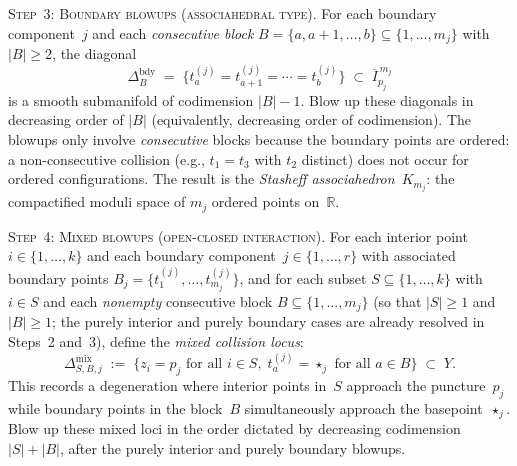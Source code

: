 \begin{construction}
\medskip
\noindent\textsc{Step~3: Boundary blowups (associahedral type).}
For each boundary component~$j$ and each \emph{consecutive
block} $B = \{a, a{+}1, \ldots, b\} \subseteq
\{1, \ldots, m_j\}$ with $|B| \geq 2$,
the diagonal
\begin{equation}\label{eq:consecutive-diagonal}
\Delta_B^{\mathrm{bdy}}
\;=\;
\bigl\{t_a^{(j)} = t_{a+1}^{(j)} = \cdots = t_b^{(j)}\bigr\}
\;\subset\;
\overline{I}_{p_j}^{\,m_j}
\end{equation}
is a smooth submanifold of codimension $|B| - 1$.  Blow up these
diagonals in decreasing order of $|B|$
(equivalently, decreasing order of codimension).
The blowups only involve \emph{consecutive} blocks because the
boundary points are ordered: a non-consecutive collision (e.g.,
$t_1 = t_3$ with $t_2$ distinct) does not occur for ordered
configurations.  The result is the
\emph{Stasheff associahedron}~$K_{m_j}$: the compactified moduli
space of $m_j$ ordered points on~$\mathbb{R}$.

\medskip
\noindent\textsc{Step~4: Mixed blowups (open-closed interaction).}
For each interior point $i \in \{1, \ldots, k\}$ and each
boundary component~$j \in \{1, \ldots, r\}$ with associated
boundary points $B_j = \{t_1^{(j)}, \ldots, t_{m_j}^{(j)}\}$,
and for each subset $S \subseteq \{1, \ldots, k\}$ with
$i \in S$ and each \emph{nonempty} consecutive block
$B \subseteq \{1, \ldots, m_j\}$ (so that $|S| \geq 1$
and $|B| \geq 1$; the purely interior and purely boundary
cases are already resolved in Steps~2 and~3), define the
\emph{mixed collision locus}:
\begin{equation}\label{eq:mixed-collision}
\Delta_{S, B, j}^{\mathrm{mix}}
\;:=\;
\bigl\{
z_i = p_j \text{ for all } i \in S,\;
t_a^{(j)} = \star_j \text{ for all } a \in B
\bigr\}
\;\subset\; Y.
\end{equation}
This records a degeneration where interior points in~$S$
approach the puncture~$p_j$ while boundary points in the
block~$B$ simultaneously approach the basepoint~$\star_j$.
Blow up these mixed loci in the order dictated by decreasing
codimension $|S| + |B|$, after the purely interior and
purely boundary blowups.


\end{construction}
